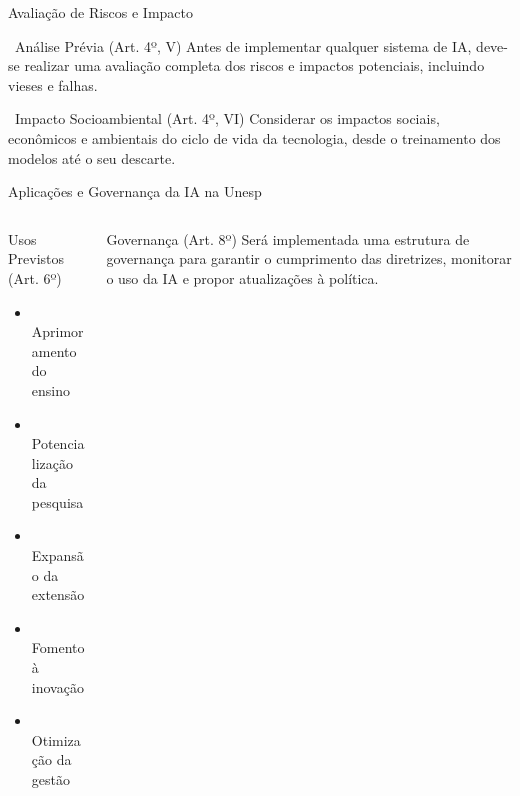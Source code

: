 \documentclass[aspectratio=169,12pt]{beamer}
\begin{document}
\begin{frame}{Avaliação de Riscos e Impacto}
    \begin{block}{\faTasks\, Análise Prévia (Art. 4º, V)}
        Antes de implementar qualquer sistema de IA, deve-se realizar uma avaliação completa dos riscos e impactos potenciais, incluindo vieses e falhas.
    \end{block}
    
    \begin{alertblock}{\faGlobe\, Impacto Socioambiental (Art. 4º, VI)}
        Considerar os impactos sociais, econômicos e ambientais do ciclo de vida da tecnologia, desde o treinamento dos modelos até o seu descarte.
    \end{alertblock}
\end{frame}
\begin{frame}{Aplicações e Governança da IA na Unesp}
    \begin{columns}
        \begin{column}{0.5\textwidth}
            \begin{block}{Usos Previstos (Art. 6º)}
                \begin{itemize}
                    \item \faBookReader\, Aprimoramento do ensino
                    \item \faFlask\, Potencialização da pesquisa
                    \item \faUsers\, Expansão da extensão
                    \item \faLightbulb\, Fomento à inovação
                    \item \faCogs\, Otimização da gestão
                \end{itemize}
            \end{block}
        \end{column}
        \begin{column}{0.5\textwidth}
            \begin{exampleblock}{Governança (Art. 8º)}
                Será implementada uma estrutura de governança para garantir o cumprimento das diretrizes, monitorar o uso da IA e propor atualizações à política.
            \end{exampleblock}
        \end{column}
    \end{columns}
\end{frame}
\end{document}
